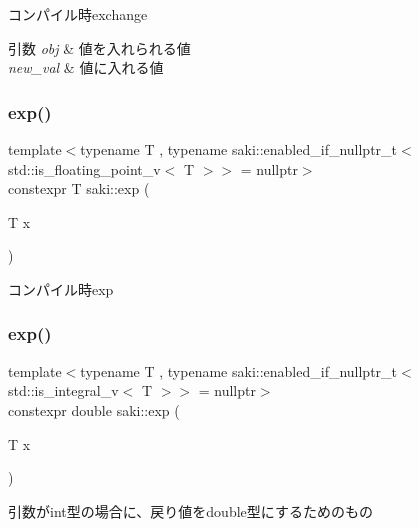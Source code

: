 コンパイル時exchange 


\begin{DoxyParams}{引数}
{\em obj} & 値を入れられる値 \\
\hline
{\em new\+\_\+val} & 値に入れる値 \\
\hline
\end{DoxyParams}
\mbox{\label{namespacesaki_abc1268e543a60d43b04f1418f5ef3e41}} 
\subsubsection{\texorpdfstring{exp()}{exp()}\hspace{0.1cm}{\footnotesize\ttfamily [1/2]}}
{\footnotesize\ttfamily template$<$typename T , typename saki\+::enabled\+\_\+if\+\_\+nullptr\+\_\+t$<$ std\+::is\+\_\+floating\+\_\+point\+\_\+v$<$ T $>$$>$  = nullptr$>$ \\
constexpr T saki\+::exp (\begin{DoxyParamCaption}\item[{T}]{x }\end{DoxyParamCaption})}



コンパイル時exp 

\mbox{\label{namespacesaki_ab7883c6dfd2cf3ae04993f64d98345fc}} 
\subsubsection{\texorpdfstring{exp()}{exp()}\hspace{0.1cm}{\footnotesize\ttfamily [2/2]}}
{\footnotesize\ttfamily template$<$typename T , typename saki\+::enabled\+\_\+if\+\_\+nullptr\+\_\+t$<$ std\+::is\+\_\+integral\+\_\+v$<$ T $>$$>$  = nullptr$>$ \\
constexpr double saki\+::exp (\begin{DoxyParamCaption}\item[{T}]{x }\end{DoxyParamCaption})}



引数がint型の場合に、戻り値をdouble型にするためのもの 

\mbox{\label{namespacesaki_a2e2d4ba08357bbab05c97ae261c80343}} 
